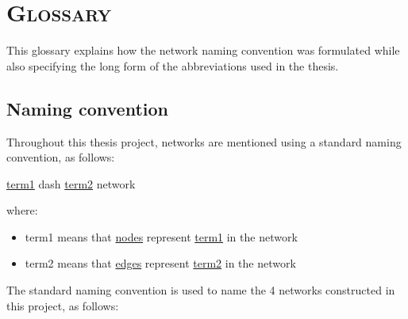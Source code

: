 \chapter{\textsc{Glossary}}
\label{chapter:glossary}

This glossary explains how the network naming convention was formulated while also specifying the long form of the abbreviations used in the thesis.

\section{Naming convention}

Throughout this thesis project, networks are mentioned using a standard naming convention, as follows:

\begin{center}
\underline{term1} dash \underline{term2} network
\end{center}

\noindent where:

\begin{itemize}[noitemsep]
    \item term1 means that \underline{nodes} represent \underline{term1} in the network
    \item term2 means that \underline{edges} represent \underline{term2} in the network
\end{itemize}

\noindent The standard naming convention is used to name the 4 networks constructed in this project, as follows:

